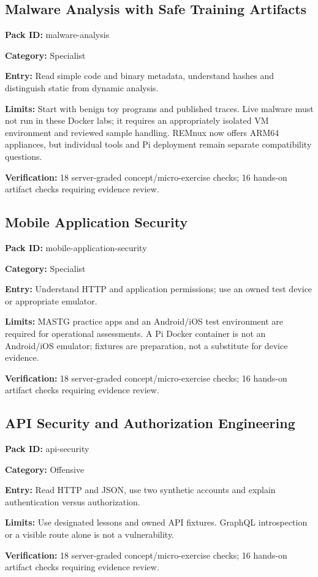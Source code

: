 \subsection{Malware Analysis with Safe Training Artifacts}
\noindent\textbf{Pack ID:} malware-analysis\par
\noindent\textbf{Category:} Specialist\par
\noindent\textbf{Entry:} Read simple code and binary metadata, understand hashes and distinguish static from dynamic analysis.\par
\noindent\textbf{Limits:} Start with benign toy programs and published traces. Live malware must not run in these Docker labs; it requires an appropriately isolated VM environment and reviewed sample handling. REMnux now offers ARM64 appliances, but individual tools and Pi deployment remain separate compatibility questions.\par
\noindent\textbf{Verification:} 18 server-graded concept/micro-exercise checks; 16 hands-on artifact checks requiring evidence review.\par
\subsection{Mobile Application Security}
\noindent\textbf{Pack ID:} mobile-application-security\par
\noindent\textbf{Category:} Specialist\par
\noindent\textbf{Entry:} Understand HTTP and application permissions; use an owned test device or appropriate emulator.\par
\noindent\textbf{Limits:} MASTG practice apps and an Android/iOS test environment are required for operational assessments. A Pi Docker container is not an Android/iOS emulator; fixtures are preparation, not a substitute for device evidence.\par
\noindent\textbf{Verification:} 18 server-graded concept/micro-exercise checks; 16 hands-on artifact checks requiring evidence review.\par
\subsection{API Security and Authorization Engineering}
\noindent\textbf{Pack ID:} api-security\par
\noindent\textbf{Category:} Offensive\par
\noindent\textbf{Entry:} Read HTTP and JSON, use two synthetic accounts and explain authentication versus authorization.\par
\noindent\textbf{Limits:} Use designated lessons and owned API fixtures. GraphQL introspection or a visible route alone is not a vulnerability.\par
\noindent\textbf{Verification:} 18 server-graded concept/micro-exercise checks; 16 hands-on artifact checks requiring evidence review.\par
